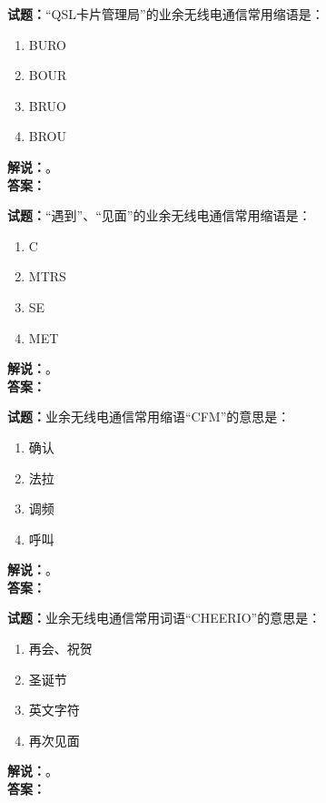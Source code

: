 \documentclass{ctexbook}
\begin{document}
\vspace{\baselineskip}

\noindent\textbf{试题：}“QSL卡片管理局”的业余无线电通信常用缩语是：
\begin{enumerate}[leftmargin=3em]
  \item BURO
  \item BOUR
  \item BRUO
  \item BROU
\end{enumerate}
\noindent\textbf{解说：}\textbf{}。\\\noindent\textbf{答案：}

\vspace{\baselineskip}

\noindent\textbf{试题：}“遇到”、“见面”的业余无线电通信常用缩语是：
\begin{enumerate}[leftmargin=3em]
  \item C
  \item MTRS
  \item SE
  \item MET
\end{enumerate}
\noindent\textbf{解说：}\textbf{}。\\\noindent\textbf{答案：}

\vspace{\baselineskip}

\noindent\textbf{试题：}业余无线电通信常用缩语“CFM”的意思是：
\begin{enumerate}[leftmargin=3em]
  \item 确认
  \item 法拉
  \item 调频
  \item 呼叫
\end{enumerate}
\noindent\textbf{解说：}\textbf{}。\\\noindent\textbf{答案：}

\vspace{\baselineskip}

\noindent\textbf{试题：}业余无线电通信常用词语“CHEERIO”的意思是：
\begin{enumerate}[leftmargin=3em]
  \item 再会、祝贺
  \item 圣诞节
  \item 英文字符
  \item 再次见面
\end{enumerate}
\noindent\textbf{解说：}\textbf{}。\\\noindent\textbf{答案：}
\end{document}
